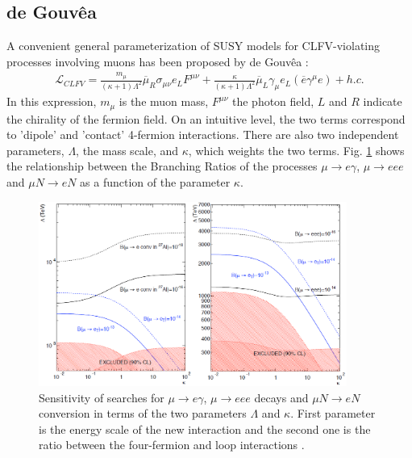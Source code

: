 \documentclass[12pt,a4paper,openright, oneside, titlepage]{book} %
\begin{document}
\subsection{de Gouv\^{e}a}
A convenient general parameterization of SUSY models for CLFV-violating processes involving muons has been proposed by de Gouv\^{e}a \cite{deGouvea}:
\begin{align}
\mathcal{L}_{CLFV}=
\frac{m_\mu}{(\kappa+1)\Lambda^2}\overline{\mu}_R\sigma_{\mu\nu}e_LF^{\mu\nu}+
\frac{\kappa}{(\kappa+1)\Lambda^2}\overline{\mu}_L\gamma_\mu e_L (\overline{e}\gamma^\mu e)+h.c.
\label{eq_deGouvea}
\end{align}
In this expression, $m_\mu$ is the muon mass, $F^{\mu\nu}$ the photon field, $L$ and $R$ indicate the chirality of the fermion field.
On an intuitive level, the two terms correspond to 'dipole' and 'contact' 4-fermion interactions.
There are also two independent parameters,  $\Lambda$, the mass scale, and $\kappa$, which weights the two terms. 
Fig. \ref{_deGouvea} shows the relationship between the Branching Ratios of the processes $\mu\rightarrow e\gamma$, $\mu\rightarrow eee$ and $\mu N \rightarrow e N$ as a function of the parameter $\kappa$. 

\begin{figure}[h!]
\centering
\includegraphics[width=0.9\textwidth]{deGouvea}
\caption[Limits on the BR]{Sensitivity of searches for $\mu\rightarrow e\gamma$, $\mu\rightarrow eee$ decays and $\mu N \rightarrow e N$ conversion in terms of the two parameters $\Lambda$ and $\kappa$. First parameter is the energy scale of the new interaction and the second one is the ratio between the four-fermion and loop interactions \cite{deGouvea}.}
\label{_deGouvea}
\end{figure}
\end{document}
